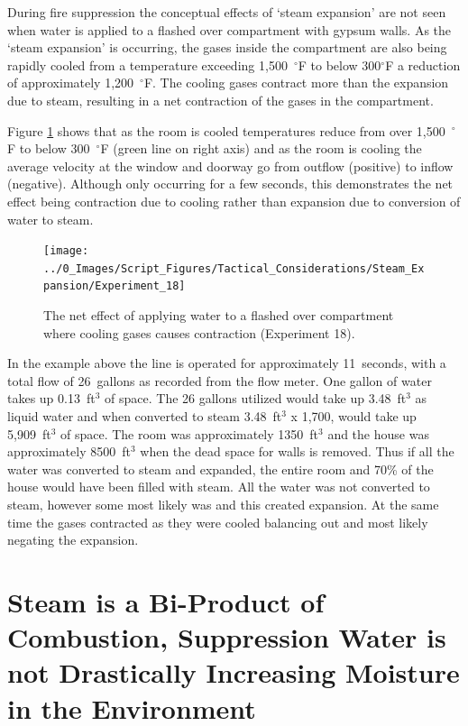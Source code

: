 \documentclass[12pt,oneside]{book}
\begin{document}
During fire suppression the conceptual effects of `steam expansion' are not seen when water is applied to a flashed over compartment with gypsum walls. As the `steam expansion' is occurring, the gases inside the compartment are also being rapidly cooled from a temperature exceeding 1,500~$^\circ$F to below 300$^\circ$F a reduction of approximately 1,200~$^\circ$F. The cooling gases contract more than the expansion due to steam, resulting in a net contraction of the gases in the compartment. 

Figure \ref{fig:expansion_TC_chart} shows that as the room is cooled temperatures reduce from over 1,500~$^\circ$F to below 300~$^\circ$F (green line on right axis) and as the room is cooling the average velocity at the window and doorway go from outflow (positive) to inflow (negative). Although only occurring for a few seconds, this demonstrates the net effect being contraction due to cooling rather than expansion due to conversion of water to steam. 

\begin{figure}[H]
\centering
\texttt{[image: ../0\_Images/Script\_Figures/Tactical\_Considerations/Steam\_Expansion/Experiment\_18]}
\caption[Gas Contraction Due to Cooling - Exterior Attack]{The net effect of applying water to a flashed over compartment where cooling gases causes contraction (Experiment 18).}
\label{fig:expansion_TC_chart}
\end{figure}

In the example above the line is operated for approximately 11~seconds, with a total flow of 26~gallons as recorded from the flow meter. One gallon of water takes up 0.13~ft$^3$ of space. The 26 gallons utilized would take up 3.48~ft$^3$ as liquid water and when converted to steam 3.48~ft$^3$ x 1,700, would take up 5,909~ft$^3$ of space. The room was approximately 1350~ft$^3$ and the house was approximately 8500~ft$^3$ when the dead space for walls is removed. Thus if all the water was converted to steam and expanded, the entire room and 70\% of the house would have been filled with steam. All the water was not converted to steam, however some most likely was and this created expansion. At the same time the gases contracted as they were cooled balancing out and most likely negating the expansion. 

\section[Steam is a bi-product of combustion]{Steam is a Bi-Product of Combustion, Suppression Water is not Drastically Increasing Moisture in the Environment} \label{tc:steam_is_biproduct_of_combustion}
\end{document}
